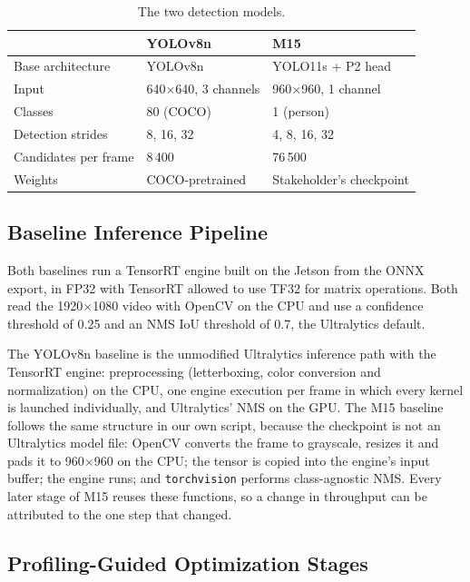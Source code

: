 \begin{table}[H]
  \centering
  \small
  \begin{tabular}{@{}lll@{}}
    \toprule
    & YOLOv8n & M15 \\
    \midrule
    Base architecture & YOLOv8n & YOLO11s + P2 head \\
    Input & 640$\times$640, 3 channels & 960$\times$960, 1 channel \\
    Classes & 80 (COCO) & 1 (person) \\
    Detection strides & 8, 16, 32 & 4, 8, 16, 32 \\
    Candidates per frame & 8\,400 & 76\,500 \\
    Weights & COCO-pretrained & Stakeholder's checkpoint \\
    \bottomrule
  \end{tabular}
  \vspace{0.5em}
  \caption{The two detection models.}
  \label{tab:models}
\end{table}
\vspace{-0.6em}

\subsection{Baseline Inference Pipeline}

Both baselines run a TensorRT engine built on the Jetson from the ONNX
export, in FP32 with TensorRT allowed to use TF32 for matrix operations. Both
read the 1920$\times$1080 video with OpenCV on the CPU and use a confidence
threshold of 0.25 and an NMS IoU threshold of 0.7, the Ultralytics default.

The YOLOv8n baseline is the unmodified Ultralytics inference path with the
TensorRT engine: preprocessing (letterboxing, color conversion and
normalization) on the CPU, one engine execution per frame in which every
kernel is launched individually, and Ultralytics' NMS on the GPU. The M15
baseline follows the same structure in our own script, because the
checkpoint is not an Ultralytics model file: OpenCV converts the frame to
grayscale, resizes it and pads it to 960$\times$960 on the CPU; the tensor is
copied into the engine's input buffer; the engine runs; and
\texttt{torchvision} performs class-agnostic NMS. Every later stage of M15
reuses these functions, so a change in throughput can be attributed to the
one step that changed.

\subsection{Profiling-Guided Optimization Stages}

